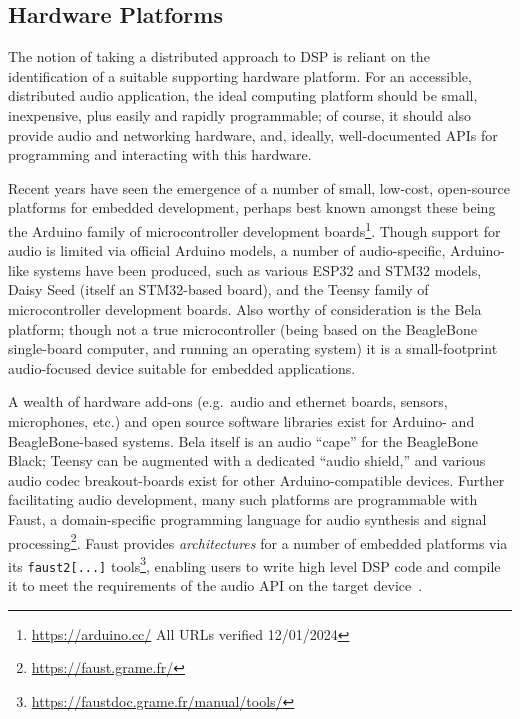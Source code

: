 \subsection{Hardware Platforms}\label{subsec:hardware-platforms}

The notion of taking a distributed approach to DSP is reliant on the
identification of a suitable supporting hardware platform.
For an accessible, distributed audio application, the ideal computing platform
should be small, inexpensive, plus easily and rapidly programmable;
of course, it should also provide audio and networking hardware, and, ideally,
well-documented APIs for programming and interacting with this hardware.

Recent years have seen the emergence of a number of small, low-cost, open-source
platforms for embedded development, perhaps best known amongst these being the
Arduino family of microcontroller development boards\footnote{\url{https://arduino.cc/} \textemdash{} All URLs verified
12/01/2024}.
Though support for audio is limited via official Arduino models, a number of
audio-specific, Arduino-like systems have been produced, such as various
ESP32 and STM32 models, Daisy Seed (itself an STM32-based board), and the Teensy
family of microcontroller development boards.
Also worthy of consideration is the Bela platform; though not a true
microcontroller (being based on the BeagleBone single-board computer, and
running an operating system) it is a small-footprint audio-focused device
suitable for embedded applications.

A wealth of hardware add-ons (e.g.\ audio and ethernet boards, sensors,
microphones, etc.) and open source software libraries exist for Arduino- and
BeagleBone-based systems.
Bela itself is an audio ``cape'' for the BeagleBone Black; Teensy can be
augmented with a dedicated ``audio shield,'' and various audio codec
breakout-boards exist for other Arduino-compatible devices.
Further facilitating audio development, many such platforms are programmable
with Faust, a domain-specific programming language for audio synthesis and
signal processing\footnote{\url{https://faust.grame.fr/}}.
Faust provides \textit{architectures} for a number of embedded platforms via its
\texttt{faust2[...]} tools\footnote{
    \url{https://faustdoc.grame.fr/manual/tools/}
}, enabling users to write high level DSP code and compile it to meet the
requirements of the audio API on the target device~\citep{michon_real_2019,
    michon_embedded_2020}.

